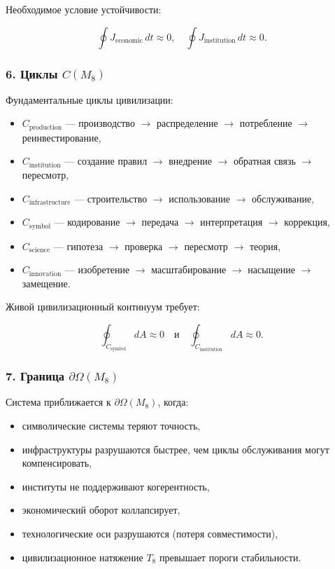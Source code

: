 Необходимое условие устойчивости:

\[
\oint J_{\mathrm{economic}} \, dt \approx 0,
\quad
\oint J_{\mathrm{institution}} \, dt \approx 0.
\]

\subsubsection*{6. Циклы \texorpdfstring{$C(M_8)$}{C(M_8)}}

Фундаментальные циклы цивилизации:

\begin{itemize}
    \item $C_{\mathrm{production}}$ — производство $\to$ распределение $\to$ потребление $\to$ реинвестирование,
    \item $C_{\mathrm{institution}}$ — создание правил $\to$ внедрение $\to$ обратная связь $\to$ пересмотр,
    \item $C_{\mathrm{infrastructure}}$ — строительство $\to$ использование $\to$ обслуживание,
    \item $C_{\mathrm{symbol}}$ — кодирование $\to$ передача $\to$ интерпретация $\to$ коррекция,
    \item $C_{\mathrm{science}}$ — гипотеза $\to$ проверка $\to$ пересмотр $\to$ теория,
    \item $C_{\mathrm{innovation}}$ — изобретение $\to$ масштабирование $\to$ насыщение $\to$ замещение.
\end{itemize}

Живой цивилизационный континуум требует:

\[
\oint_{C_{\mathrm{symbol}}} dA \approx 0
\quad\text{и}\quad
\oint_{C_{\mathrm{institution}}} dA \approx 0.
\]

\subsubsection*{7. Граница \texorpdfstring{$\partial\Omega(M_8)$}{\partial\Omega(M_8)}}

Система приближается к $\partial\Omega(M_8)$, когда:

\begin{itemize}
    \item символические системы теряют точность,
    \item инфраструктуры разрушаются быстрее, чем циклы обслуживания могут компенсировать,
    \item институты не поддерживают когерентность,
    \item экономический оборот коллапсирует,
    \item технологические оси разрушаются (потеря совместимости),
    \item цивилизационное натяжение $T_8$ превышает пороги стабильности.
\end{itemize}

